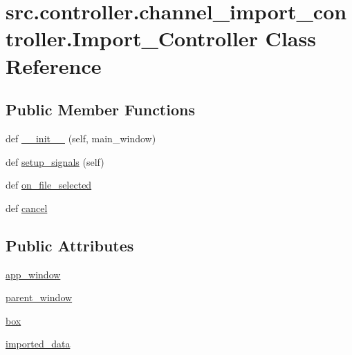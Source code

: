 \hypertarget{classsrc_1_1controller_1_1channel__import__controller_1_1Import__Controller}{}\section{src.\+controller.\+channel\+\_\+import\+\_\+controller.\+Import\+\_\+\+Controller Class Reference}
\label{classsrc_1_1controller_1_1channel__import__controller_1_1Import__Controller}
\subsection*{Public Member Functions}
\begin{DoxyCompactItemize}
\item 
def \hyperlink{classsrc_1_1controller_1_1channel__import__controller_1_1Import__Controller_adf3b087dfa49ae316dd84232a15538a8}{\+\_\+\+\_\+init\+\_\+\+\_\+} (self, main\+\_\+window)
\item 
def \hyperlink{classsrc_1_1controller_1_1channel__import__controller_1_1Import__Controller_aaee5ceebbea99c0f56ad2bf0b58580c3}{setup\+\_\+signals} (self)
\item 
def \hyperlink{classsrc_1_1controller_1_1channel__import__controller_1_1Import__Controller_a6ced14970f19bcb0e984458333d4e107}{on\+\_\+file\+\_\+selected}
\item 
def \hyperlink{classsrc_1_1controller_1_1channel__import__controller_1_1Import__Controller_a636f39520e2a7623d674441815eab498}{cancel}
\end{DoxyCompactItemize}
\subsection*{Public Attributes}
\begin{DoxyCompactItemize}
\item 
\hyperlink{classsrc_1_1controller_1_1channel__import__controller_1_1Import__Controller_ae86232841aa8da3ffb1258833027987b}{app\+\_\+window}
\item 
\hyperlink{classsrc_1_1controller_1_1channel__import__controller_1_1Import__Controller_ad7945e37509da3a09ae56a2750a600a2}{parent\+\_\+window}
\item 
\hyperlink{classsrc_1_1controller_1_1channel__import__controller_1_1Import__Controller_a19377aa9a7db7367781d061e954a5a65}{box}
\item 
\hyperlink{classsrc_1_1controller_1_1channel__import__controller_1_1Import__Controller_a2c6bfec1c1a31dcb0b46b3f0566b2d1a}{imported\+\_\+data}
\end{DoxyCompactItemize}
